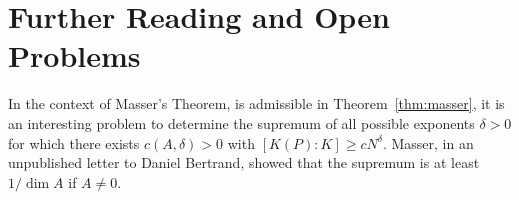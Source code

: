 \section{Further Reading and Open Problems}

In the context of Masser's Theorem, is admissible in
Theorem~\ref{thm:masser}, it is an interesting problem to determine
the supremum of all possible exponents $\delta>0$ for which there
exists $c(A,\delta)>0$ with $[K(P):K]\ge c N^{\delta}$. Masser, in an
unpublished letter to Daniel Bertrand, showed that the supremum is at
least $1/\dim A$ if $A\not=0$. 


